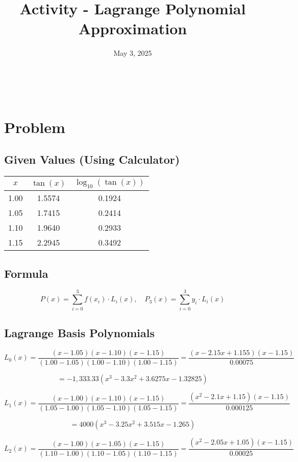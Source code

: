 \documentclass[legalpaper,11pt,extrafontsizes,oneside,openany,x11names]{memoir}
\title{Activity - Lagrange Polynomial Approximation}
\date{May 3, 2025}
\makeatletter
\def\maketitle{
    \begin{center}
        \LARGE \textbf{\@title} \\[0.5ex]
        \large \@date
    \end{center}
}
\makeatother
\begin{document}
\maketitle

\section*{Problem}

\subsection*{Given Values (Using Calculator)}

\begin{center}
\begin{tabular}{|c|c|c|}
\hline
$x$ & $\tan(x)$ & $\log_{10}(\tan(x))$ \\
\hline
1.00 & 1.5574 & 0.1924 \\
1.05 & 1.7415 & 0.2414 \\
1.10 & 1.9640 & 0.2933 \\
1.15 & 2.2945 & 0.3492 \\
\hline
\end{tabular}
\end{center}

\subsection*{Formula}

\[
P(x) = \sum_{i=0}^{3} f(x_i) \cdot L_i(x), \quad P_3(x) = \sum_{i=0}^{3} y_i \cdot L_i(x)
\]

\subsection*{Lagrange Basis Polynomials}

\[
L_0(x) = \frac{(x - 1.05)(x - 1.10)(x - 1.15)}{(1.00 - 1.05)(1.00 - 1.10)(1.00 - 1.15)} = \frac{(x - 2.15x + 1.155)(x - 1.15)}{0.00075}
\]

\[
= -1,333.33(x^3 - 3.3x^2 + 3.6275x - 1.32825) 
\]

\[
L_1(x) = \frac{(x - 1.00)(x - 1.10)(x - 1.15)}{(1.05 - 1.00)(1.05 - 1.10)(1.05 - 1.15)} = \frac{(x^2 - 2.1x + 1.15)(x - 1.15)}{0.000125}
\]

\[
= 4000(x^3 - 3.25x^2 + 3.515x - 1.265)
\]

\[
L_2(x) = \frac{(x - 1.00)(x - 1.05)(x - 1.15)}{(1.10 - 1.00)(1.10 - 1.05)(1.10 - 1.15)} = \frac{(x^2 - 2.05x + 1.05)(x - 1.15)}{0.00025}
\]
\end{document}
